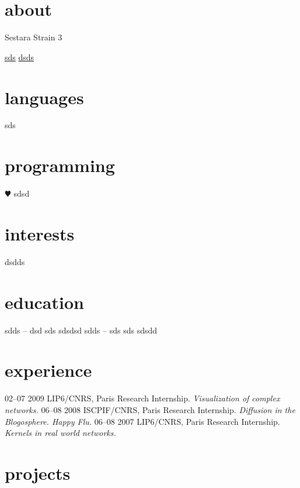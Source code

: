 \documentclass[]{friggeri-cv}
\begin{document}


\begin{aside}
  \section{about}
    Sestara Strain 3
    
    \href{mailto:sds}{sds}
    \href{dsds}{dsds}
  \section{languages}
    sds
  \section{programming}
    {\color{red} $\varheartsuit$} sdsd
\end{aside}

\section{interests}

dsdds

\section{education}

\begin{entrylist}
  \entry
    {sdds – dsd}
    {sds}
    {}
    {sdsdsd}
  \entry
    {sdds – sds}
    {sds}
    {}
    {sdsdd}
  \end{entrylist}

\section{experience}

\begin{entrylist}
  \entry
    {02–07 2009}
    {LIP6/CNRS, Paris}
    {Research Internship.}
    {\emph{Visualization of complex networks.}}
  \entry
    {06–08 2008}
    {ISCPIF/CNRS, Paris}
    {Research Internship.}
    {\emph{Diffusion in the Blogosphere. Happy Flu.}}
  \entry
    {06–08 2007}
    {LIP6/CNRS, Paris}
    {Research Internship.}
    {\emph{Kernels in real world networks.}}
\end{entrylist}

\section{projects}
\end{document}
